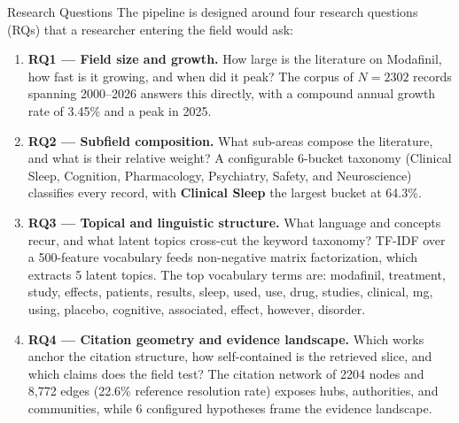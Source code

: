 \documentclass[
  ignorenonframetext,
]{beamer}
\begin{document}
\begin{frame}[allowframebreaks]{Research Questions}
\protect{}\label{research-questions}
The pipeline is designed around four research questions (RQs) that a
researcher entering the field would ask:

\begin{enumerate}
\item
  \textbf{RQ1 --- Field size and growth.} How large is the literature on
  Modafinil, how fast is it growing, and when did it peak? The corpus of
  \(N = 2302\) records spanning 2000--2026 answers this directly, with a
  compound annual growth rate of 3.45\% and a peak in 2025.
\item
  \textbf{RQ2 --- Subfield composition.} What sub-areas compose the
  literature, and what is their relative weight? A configurable 6-bucket
  taxonomy (Clinical Sleep, Cognition, Pharmacology, Psychiatry, Safety,
  and Neuroscience) classifies every record, with \textbf{Clinical
  Sleep} the largest bucket at 64.3\%.
\item
  \textbf{RQ3 --- Topical and linguistic structure.} What language and
  concepts recur, and what latent topics cross-cut the keyword taxonomy?
  TF-IDF over a 500-feature vocabulary feeds non-negative matrix
  factorization, which extracts 5 latent topics. The top vocabulary
  terms are: modafinil, treatment, study, effects, patients, results,
  sleep, used, use, drug, studies, clinical, mg, using, placebo,
  cognitive, associated, effect, however, disorder.
\item
  \textbf{RQ4 --- Citation geometry and evidence landscape.} Which works
  anchor the citation structure, how self-contained is the retrieved
  slice, and which claims does the field test? The citation network of
  2204 nodes and 8,772 edges (22.6\% reference resolution rate) exposes
  hubs, authorities, and communities, while 6 configured hypotheses
  frame the evidence landscape.
\end{enumerate}
\end{frame}
\end{document}
